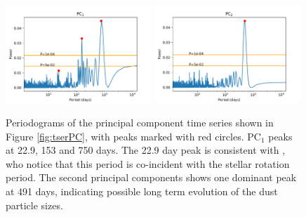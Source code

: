 \documentclass[preprint,trackchanges]{aastex61}
\begin{document}
\begin{figure}[!hbtp]
\begin{centering}
\includegraphics[width=0.49\textwidth]{pc1_periodogram.pdf}
\includegraphics[width=0.49\textwidth]{pc2_periodogram.pdf}
\caption{Periodograms of the principal component time series shown in Figure \ref{fig:tserPC}, with peaks marked with red circles.
PC$_1$  peaks at 22.9, 153 and 750 days.
The 22.9 day peak is consistent with \citet{kawahara2013starspots}, who notice that this period is co-incident with the stellar rotation period.
The second principal components shows one dominant peak at 491 days,  indicating possible long term evolution of the dust particle sizes.
}\label{fig:ampPeriodogram}
\end{centering}
\end{figure}
\end{document}
